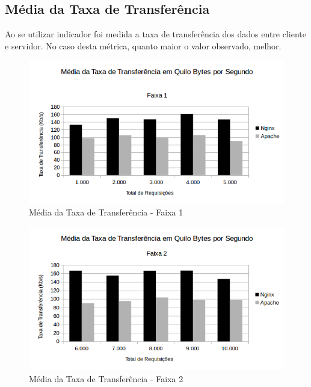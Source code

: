 \subsection{Média da Taxa de Transferência}
Ao se utilizar indicador foi medida a taxa de transferência dos dados entre 
cliente e 
servidor. No caso desta métrica, quanto maior o valor observado, melhor.

\begin{figure}[H]
	\centering
	\includegraphics[width=1\linewidth]{graficos/grafico6-f1} 
	\caption{Média da Taxa de Transferência - Faixa 1}
	\label{fig:grafico6-f1}
\end{figure}

\begin{figure}[H]
	\centering
	\includegraphics[width=1\linewidth]{graficos/grafico6-f2} 
	\caption{Média da Taxa de Transferência - Faixa 2}
	\label{fig:grafico6-f2}
\end{figure}

